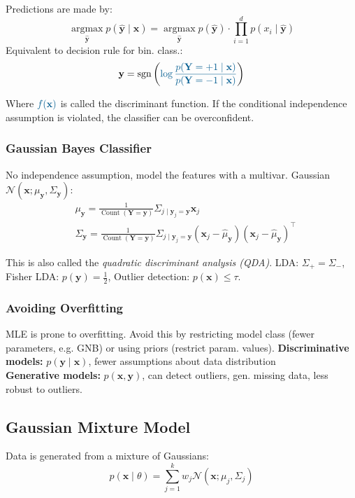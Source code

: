 \documentclass[a4paper,11pt]{article}
\begin{document}
Predictions are made by:
$$\textstyle \underset{\hat{\mathbf{y}}}{\operatorname{argmax}} p(\hat{\mathbf{y}} \mid \mathbf{x})=\underset{\hat{\mathbf{y}}}{\operatorname{argmax}} p(\hat{\mathbf{y}}) \cdot \prod_{i=1}^d p\left(x_i \mid \hat{\mathbf{y}}\right)$$
Equivalent to decision rule for bin. class.:
$$
\mathbf{y}=\operatorname{sgn}\left(\textcolor{pri}{\log \frac{p(\mathbf{Y}=+1 \mid \mathbf{x})}{p(\mathbf{Y}=-1 \mid \mathbf{x)}}}\right)
$$

Where $\textcolor{pri}{f(\mathbf{x})}$ is called the discriminant function. If the conditional independence assumption is violated, the classifier can be overconfident. 

\subsubsection*{Gaussian Bayes Classifier}
No independence assumption, model the features with a multivar. Gaussian 
$\mathcal{N}(\mathbf{x} ; \mu_{\mathbf{y}}, \Sigma_{\mathbf{y}})$:
$$
\begin{aligned}
&\textstyle \mu_{\mathbf{y}}=\frac{1}{\operatorname{Count}(\mathbf{Y}=\mathbf{y})} \Sigma_{j \mid \mathbf{y}_j=\mathbf{y}} \mathbf{x}_j \\
&\textstyle \Sigma_{\mathbf{y}}=\frac{1}{\operatorname{Count}(\mathbf{Y}=\mathbf{y})} \Sigma_{j \mid \mathbf{y}_j=\mathbf{y}}\left(\mathbf{x}_j-\hat{\mu}_{\mathbf{y}}\right)\left(\mathbf{x}_j-\hat{\mu}_{\mathbf{y}}\right)^{\top}
\end{aligned}
$$

This is also called the \textit{quadratic discriminant analysis (QDA)}. LDA: $\Sigma_{+}=\Sigma_{-}$, Fisher LDA: $p(\mathbf{y})=\frac{1}{2}$, Outlier detection: $p(\mathbf{x}) \leq \tau$. 
\subsubsection*{Avoiding Overfitting}
MLE is prone to overfitting. Avoid this by restricting model class (fewer parameters, e.g. GNB) or using priors (restrict param. values).  
\textbf{Discriminative models:}
$p(\mathbf{y} \mid \mathbf{x})$, fewer assumptions about data distribution \\
\textbf{Generative models:}
$p(\mathbf{x}, \mathbf{y})$, can detect outliers, gen. missing data, less robust to outliers.

\subsection*{Gaussian Mixture Model}
Data is generated from a mixture of Gaussians:
$$
\textstyle p(\mathbf{x} \mid \theta) = \sum_{j=1}^{k} w_j \mathcal{N}(\mathbf{x}; \mu_j, \Sigma_j)
$$
\end{document}
